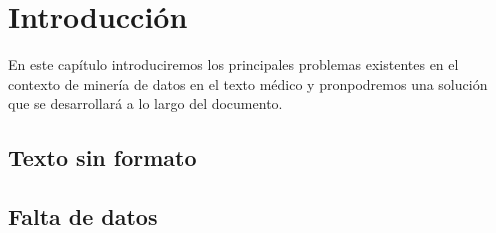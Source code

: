 \chapter{Introducción}

En este capítulo introduciremos los principales problemas existentes en el contexto de minería de datos en el texto médico y pronpodremos una solución que se desarrollará a lo largo del documento.

\section{Texto sin formato}

\section{Falta de datos}

